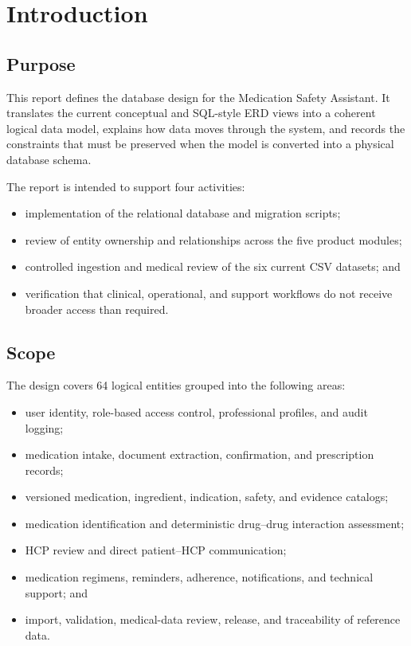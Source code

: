 \section{Introduction}

\subsection{Purpose}

This report defines the database design for the Medication Safety Assistant. It translates the current conceptual and SQL-style ERD views into a coherent logical data model, explains how data moves through the system, and records the constraints that must be preserved when the model is converted into a physical database schema.

The report is intended to support four activities:
\begin{itemize}
  \item implementation of the relational database and migration scripts;
  \item review of entity ownership and relationships across the five product modules;
  \item controlled ingestion and medical review of the six current CSV datasets; and
  \item verification that clinical, operational, and support workflows do not receive broader access than required.
\end{itemize}

\subsection{Scope}

The design covers 64 logical entities grouped into the following areas:
\begin{itemize}
  \item user identity, role-based access control, professional profiles, and audit logging;
  \item medication intake, document extraction, confirmation, and prescription records;
  \item versioned medication, ingredient, indication, safety, and evidence catalogs;
  \item medication identification and deterministic drug--drug interaction assessment;
  \item HCP review and direct patient--HCP communication;
  \item medication regimens, reminders, adherence, notifications, and technical support; and
  \item import, validation, medical-data review, release, and traceability of reference data.
\end{itemize}

